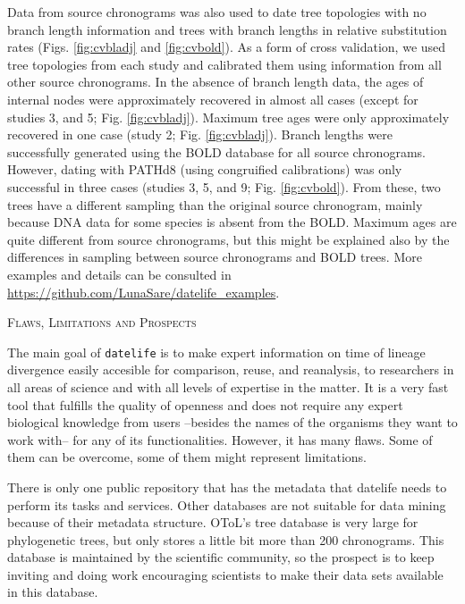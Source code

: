 \documentclass[]{article}
\begin{document}
Data from source chronograms was also used to date tree topologies with no branch length information and trees with branch lengths in relative substitution rates (Figs. \ref{fig:cvbladj} and \ref{fig:cvbold}). As a form of cross validation, we used tree topologies from each study and calibrated them using information from all other source chronograms. In the absence of branch length data, the ages of internal nodes were approximately recovered in almost all cases (except for studies 3, and 5; Fig. \ref{fig:cvbladj}). Maximum tree ages were only approximately recovered in one case (study 2; Fig. \ref{fig:cvbladj}).
Branch lengths were successfully generated using the BOLD database for all source chronograms. However, dating with PATHd8 (using congruified calibrations) was only successful in
three cases (studies 3, 5, and 9; Fig. \ref{fig:cvbold}). From these, two trees have a different sampling than the original source chronogram, mainly because DNA data for some species is absent from the BOLD. Maximum ages are quite different from source chronograms, but this might be explained also by the differences in sampling between source chronograms and BOLD trees.
More examples and details can be consulted in \url{https://github.com/LunaSare/datelife_examples}.

\begin{center}
\textsc{Flaws, Limitations and Prospects}
\end{center}

The main goal of \texttt{datelife} is to make expert information on time of lineage divergence easily accesible for comparison, reuse, and reanalysis, to researchers in all areas of science and with all levels of expertise in the matter. It is a very fast tool that fulfills the quality of openness and does not require any expert biological knowledge from users --besides the names of the organisms they want to work with-- for any of its functionalities. However, it has many flaws. Some of them can be overcome, some of them might represent limitations.

There is only one public repository that has the metadata that datelife needs to perform its tasks and services.
Other databases are not suitable for data mining because of their metadata structure.
OToL's tree database is very large for phylogenetic trees, but only stores a little bit more than 200 chronograms. This database is maintained by the scientific community, so the prospect is to keep inviting and doing work encouraging scientists to make their data sets available in this database.
\end{document}
